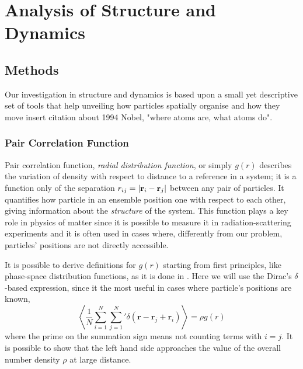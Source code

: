 \documentclass[../../master_thesis_np.tex]{subfiles}
\begin{document}
	\chapter{Analysis of Structure and Dynamics}

	\section{Methods}
	Our investigation in structure and dynamics is based upon a small yet descriptive set of tools that help unveiling how particles spatially organise and how they move {\color{blue} insert citation about 1994 Nobel, "where atoms are, what atoms do"}.
	
		\subsection{Pair Correlation Function}
		Pair correlation function, \emph{radial distribution function}, or simply $g(r)$ describes the variation of density with respect to distance to a reference in a system; it is a function only of the separation $r_{ij} = \abs{\vb{r}_i - \vb{r}_j}$ between any pair of particles. 
		It quantifies how particle in an ensemble position one with respect to each other, giving information about the \emph{structure} of the system. 
		This function plays a key role in physics of matter since it is possible to measure it in radiation-scattering experiments and it is often used in cases where, differently from our problem, particles' positions are not directly accessible.
		
		It is possible to derive definitions for $g(r)$ starting from first principles, like phase-space distribution functions, as it is done in \cite{hansen90a}. 
		Here we will use the Dirac's $\delta$-based expression, since it the most useful in cases where particle's positions are known,
		\begin{equation}
			\left\langle \frac{1}{N} \sum_{i=1}^{N} \sum_{j=1}^{N}{}' \delta (\mathbf{r} - \mathbf{r}_j + \mathbf{r}_i) \right\rangle = \rho g(r)
		\end{equation}
		where the prime on the summation sign means not counting terms with $i = j$. 
		It is possible to show that the left hand side approaches the value of the overall number density $\rho$ at large distance.
		
\end{document}
